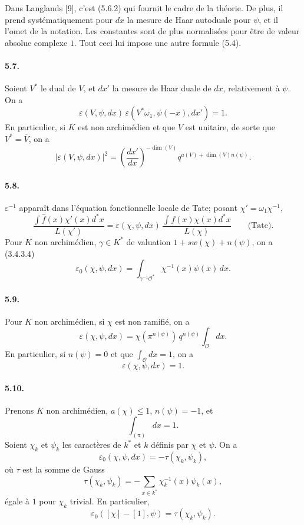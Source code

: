 \documentclass[10pt]{article}
\begin{document}
Dans Langlands [9], c'est (5.6.2) qui fournit le cadre de la théorie. De plus, il prend systématiquement pour \(dx\) la mesure de Haar autoduale pour \(\psi\), et il l'omet de la notation. Les constantes sont de plus normalisées pour être de valeur absolue complexe \(1\). Tout ceci lui impose une autre formule (5.4).

\paragraph{5.7.} Soient \(V^*\) le dual de \(V\), et \(dx'\) la mesure de Haar duale de \(dx\), relativement à \(\psi\). On a
\[
\tag{5.7.1}
\varepsilon(V,\psi,dx)\,
\varepsilon(V^*\omega_1,\psi(-x),dx')=1.
\]
En particulier, si \(K\) est non archimédien et que \(V\) est unitaire, de sorte que \(V^*=\overline V\), on a
\[
\tag{5.7.2}
|\varepsilon(V,\psi,dx)|^2
=
\left(\frac{dx'}{dx}\right)^{-\dim(V)}
q^{a(V)+\dim(V)n(\psi)}.
\]

\paragraph{5.8.} \(\varepsilon^{-1}\) apparaît dans l'équation fonctionnelle locale de Tate; posant \(\chi'=\omega_1\chi^{-1}\),
\[
\tag{5.8.1}
\frac{\displaystyle\int \widehat f(x)\chi'(x)d^*x}{L(\chi')}
=
\varepsilon(\chi,\psi,dx)\,
\frac{\displaystyle\int f(x)\chi(x)d^*x}{L(\chi)}
\qquad\text{(Tate).}
\]
Pour \(K\) non archimédien, \(\gamma\in K^*\) de valuation \(1+sw(\chi)+n(\psi)\), on a (3.4.3.4)
\[
\tag{5.8.2}
\varepsilon_0(\chi,\psi,dx)
=
\int_{\gamma^{-1}\mathcal O^*}\chi^{-1}(x)\psi(x)\,dx.
\]

\paragraph{5.9.} Pour \(K\) non archimédien, si \(\chi\) est non ramifié, on a
\[
\varepsilon(\chi,\psi,dx)
=
\chi(\pi^{n(\psi)})\,q^{n(\psi)}
\int_{\mathcal O}dx.
\]
En particulier, si \(n(\psi)=0\) et que \(\int_{\mathcal O}dx=1\), on a
\[
\varepsilon(\chi,\psi,dx)=1.
\]

\paragraph{5.10.} Prenons \(K\) non archimédien, \(a(\chi)\le1\), \(n(\psi)=-1\), et
\[
\int_{(\pi)}dx=1.
\]
Soient \(\chi_k\) et \(\psi_k\) les caractères de \(k^*\) et \(k\) définis par \(\chi\) et \(\psi\). On a
\[
\tag{5.10.1}
\varepsilon_0(\chi,\psi,dx)=-\tau(\chi_k,\psi_k),
\]
où \(\tau\) est la somme de Gauss
\[
\tag{5.10.2}
\tau(\chi_k,\psi_k)
=
-\sum_{x\in k^*}\chi_k^{-1}(x)\psi_k(x),
\]
égale à \(1\) pour \(\chi_k\) trivial. En particulier,
\[
\tag{5.10.3}
\varepsilon_0([\chi]-[1],\psi)=\tau(\chi_k,\psi_k).
\]
\end{document}
